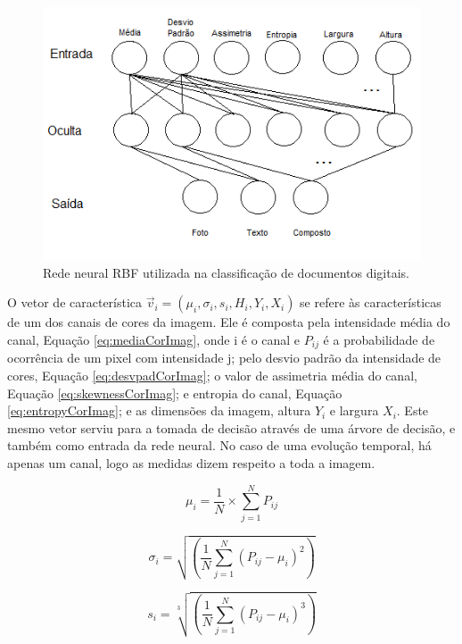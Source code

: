 \documentclass[12pt,a4paper]{report}
\begin{document}
	\begin{figure}[H]
		\centering
		\includegraphics[scale=1]{./img/rede_neural_RBF_doc_class.png}
		\caption{Rede neural RBF utilizada na classificação de documentos digitais.}
		\label{fig:RedeNeuralRBFDocClass}
	\end{figure}
	
	O vetor de característica $\vec{v}_i=(\mu_i,\sigma_i,s_i,H_i,Y_i,X_i)$ se refere às características de um dos canais de cores da imagem. Ele é composta pela intensidade média do canal, Equação \ref{eq:mediaCorImag}, onde i é o canal e $P_{ij}$ é a probabilidade de ocorrência de um pixel com intensidade j; pelo desvio padrão da intensidade de cores, Equação \ref{eq:desvpadCorImag}; o valor de assimetria média do canal, Equação \ref{eq:skewnessCorImag}; e entropia do canal, Equação \ref{eq:entropyCorImag}; e as dimensões da imagem, altura $Y_i$ e largura $X_i$. Este mesmo vetor serviu para a tomada de decisão através de uma árvore de decisão, e também como entrada da rede neural. No caso de uma evolução temporal, há apenas um canal, logo as medidas dizem respeito a toda a imagem.
	
	\begin{equation}
	\mu_i = \frac{1}{N}\times \sum_{j=1}^{N}P_{ij}
	\label{eq:mediaCorImag}
	\end{equation}
	
	\begin{equation}
	\sigma_i=\sqrt{\left ( \frac{1}{N}\sum_{j=1}^{N}\left ( P_{ij}-\mu_i \right )^2 \right )}
	\label{eq:desvpadCorImag}
	\end{equation}
	
	\begin{equation}
	s_i=\sqrt[3]{\left ( \frac{1}{N}\sum_{j=1}^{N}\left ( P_{ij}-\mu_i \right )^3 \right )}
	\label{eq:skewnessCorImag}
	\end{equation}
	
\end{document}
